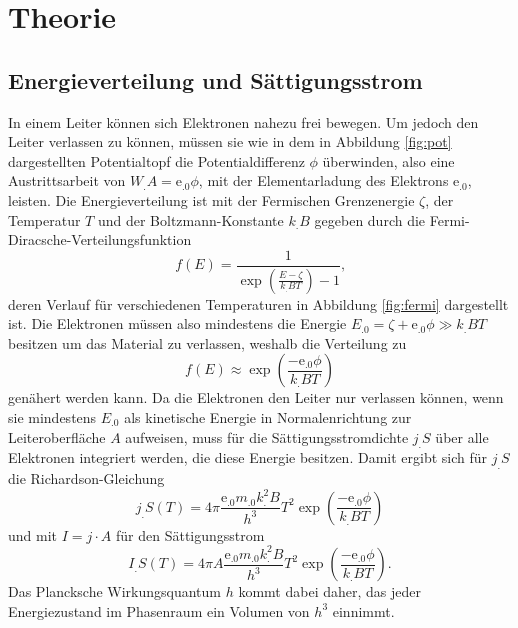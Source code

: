\section{Theorie}
\label{sec:Theorie}

\subsection{Energieverteilung und Sättigungsstrom}

In einem Leiter können sich Elektronen nahezu frei bewegen. Um jedoch den Leiter verlassen zu können, müssen sie wie in dem in Abbildung \ref{fig:pot} dargestellten Potentialtopf die Potentialdifferenz $\phi$ überwinden, also eine Austrittsarbeit von $W_.A=\mathrm{e}_.0\phi$, mit der Elementarladung des Elektrons $\mathrm{e}_.0$, leisten. \newline
Die Energieverteilung ist mit der Fermischen Grenzenergie $\zeta$, der Temperatur $T$ und der Boltzmann-Konstante $k_.B$ gegeben durch die Fermi-Diracsche-Verteilungsfunktion
\[
f(E)= \frac{1}{\exp{\left(\frac{E-\zeta}{k_.BT}\right)}-1}\text{,}
\]
deren Verlauf für verschiedenen Temperaturen in Abbildung \ref{fig:fermi} dargestellt ist.
Die Elektronen müssen also mindestens die Energie $E_.0=\zeta + \mathrm{e}_.0\phi\gg k_.BT$ besitzen um das Material zu verlassen, weshalb die Verteilung zu 
\begin{equation}
f(E)\approx\exp{\left(\frac{-\mathrm{e}_.0\phi}{k_.BT}\right)}\label{eq:FDV}
\end{equation}
genähert werden kann. Da die Elektronen den Leiter nur verlassen können, wenn sie mindestens $E_.0$ als kinetische Energie in Normalenrichtung zur Leiteroberfläche $A$ aufweisen, muss für die Sättigungsstromdichte $j_.S$ über alle Elektronen integriert werden, die diese Energie besitzen. Damit ergibt sich für $j_.S$ die Richardson-Gleichung
\[
j_.S(T)=4\pi\frac{\mathrm{e}_.0m_.0k^2_.B}{h^3}T^2\exp{\left(\frac{-\mathrm{e}_.0\phi}{k_.BT}\right)}
\]
und mit $I=j\cdot A$ für den Sättigungsstrom 
\begin{equation}
I_.S(T) = 4\pi A\frac{\mathrm{e}_.0m_.0k^2_.B}{h^3}T^2\exp{\left(\frac{-\mathrm{e}_.0\phi}{k_.BT}\right)}\text{.}
\end{equation}
Das Plancksche Wirkungsquantum $h$ kommt dabei daher, das jeder Energiezustand im Phasenraum ein Volumen von $h^3$ einnimmt.

